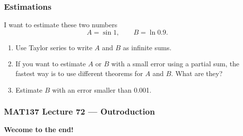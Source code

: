 \documentclass[14pt]{beamer}
\newcommand{\vv}{\vspace{.5cm}}
\begin{document}
	\begin{frame}[t]
		\frametitle{Estimations}

		I want to estimate these two numbers
		\[
			A = \sin 1, \quad \quad B = \ln 0.9.
		\]

		\begin{enumerate}
			\item Use Taylor series to write $A$ and $B$ as infinite sums. \vv

			\item If you want to estimate $A$ or $B$ with a small error using a partial
				sum, the fastest way is to use different theorems for $A$ and $B$. What are
				they? \vv

			\item Estimate $B$ with an error smaller than 0.001.
		\end{enumerate}
	\end{frame}














\begin{frame}
	\frametitle{MAT137 Lecture 72 --- Outroduction}

	\vfill
	{\bf Wecome to the end!}
\end{frame}
\end{document}
